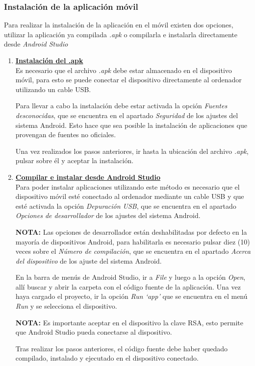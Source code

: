 \documentclass[12pt]{article}
\begin{document}
        \subsubsection{Instalación de la aplicación móvil}
            Para realizar la instalación de la aplicación en el móvil existen dos opciones, utilizar la aplicación ya compilada \textit{.apk} o compilarla e instalarla directamente desde \textit{Android Studio}
            
            \begin{enumerate}
                \item \textbf{\underline{Instalación del .apk}} \\
                Es necesario que el archivo \textit{.apk} debe estar almacenado en el dispositivo móvil, para esto se puede conectar el dispositivo directamente al ordenador utilizando un cable USB.

                Para llevar a cabo la instalación debe estar activada la opción \textit{Fuentes desconocidas}, que se encuentra en el apartado \textit{Seguridad} de los ajustes del sistema Android. Esto hace que sea posible la instalación de aplicaciones que provengan de fuentes no oficiales.

                Una vez realizados los pasos anteriores, ir hasta la ubicación del archivo \textit{.apk}, pulsar sobre él y aceptar la instalación.

                \item \textbf{\underline{Compilar e instalar desde Android Studio}} \\
                Para poder instalar aplicaciones utilizando este método es necesario que el dispositivo móvil esté conectado al ordenador mediante un cable USB y que esté activada la opción \textit{Depuración USB}, que se encuentra en el apartado \textit{Opciones de desarrollador} de los ajustes del sistema Android.

                \textbf{NOTA:} Las opciones de desarrollador están deshabilitadas por defecto en la mayoría de dispositivos Android, para habilitarla es necesario pulsar diez (10) veces sobre el \textit{Número de compilación}, que se encuentra en el apartado \textit{Acerca del dispositivo} de los ajuste del sistema Android.

                En la barra de menús de Android Studio, ir a \textit{File} y luego a la opción \textit{Open}, allí buscar y abrir la carpeta con el código fuente de la aplicación. Una vez haya cargado el proyecto, ir la opción \textit{Run `app'} que se encuentra en el menú \textit{Run} y se selecciona el dispositivo.
                
                \textbf{NOTA:} Es importante aceptar en el dispositivo la clave RSA, esto permite que Android Studio pueda conectarse al dispositivo.

                Tras realizar los pasos anteriores, el código fuente debe haber quedado compilado, instalado y ejecutado en el dispositivo conectado.
            \end{enumerate}
\end{document}
